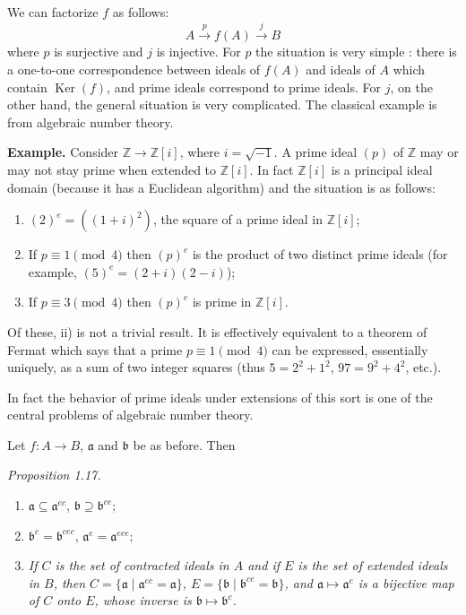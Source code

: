 We can factorize $f$ as follows:
\[
 A\xrightarrow{p}f(A)\xrightarrow{j}B
\]
where $p$ is surjective and $j$ is injective. For $p$ the situation is very simple : there is a one-to-one correspondence between ideals of $f(A)$ and ideals of $A$ which contain $\operatorname{Ker}(f)$, and prime ideals correspond to prime ideals. For $j$, on the other hand, the general situation is very complicated. The classical example is from algebraic number theory.

\noindent\textbf{Example.} Consider $\mathbb Z\longrightarrow\mathbb Z[i]$, where $i=\sqrt{-1}$. A prime ideal $(p)$ of $\mathbb Z$ may or may not stay prime when extended to $\mathbb Z[i]$. In fact $\mathbb Z[i]$ is a principal ideal domain (because it has a Euclidean algorithm) and the situation is as follows:
\begin{enumerate}
\renewcommand{\labelenumi}{\roman{enumi})}
\item $(2)^e=((1+i)^2)$, the square of a prime ideal in $\mathbb Z[i]$;
\item If $p\equiv1\pmod 4$ then $(p)^e$ is the product of two distinct prime ideals (for example, $(5)^e=(2+i)(2-i)$);
\item If $p\equiv3\pmod 4$ then $(p)^e$ is prime in $\mathbb Z[i]$.
\end{enumerate}
Of these, ii) is not a trivial result. It is effectively equivalent to a theorem of Fermat which says that a prime $p\equiv1\pmod 4$ can be expressed, essentially uniquely, as a sum of two integer squares (thus $5=2^2+1^2$, $97=9^2+4^2$, etc.).

In fact the behavior of prime ideals under extensions of this sort is one of the central problems of algebraic number theory.

Let $f:A\longrightarrow B$, $\mathfrak a$ and $\mathfrak b$ be as before. Then

\noindent\textit{Proposition 1.17.}
\begin{enumerate}
\renewcommand{\labelenumi}{\roman{enumi})}
\item $\mathfrak a\subseteq\mathfrak a^{ec}$, $\mathfrak b\supseteq\mathfrak b^{ce}$;
\item $\mathfrak b^c=\mathfrak b^{cec}$, $\mathfrak a^e=\mathfrak a^{ece}$;
\item \textit{If $C$ is the set of contracted ideals in $A$ and if $E$ is the set of extended ideals in $B$, then $C=\{\mathfrak a\mid\mathfrak a^{ec}=\mathfrak a\}$, $E=\{\mathfrak b\mid\mathfrak b^{ce}=\mathfrak b\}$, and $\mathfrak a\mapsto\mathfrak a^e$ is a bijective map of $C$ onto $E$, whose inverse is $\mathfrak b\mapsto\mathfrak b^c$.}
\end{enumerate}

